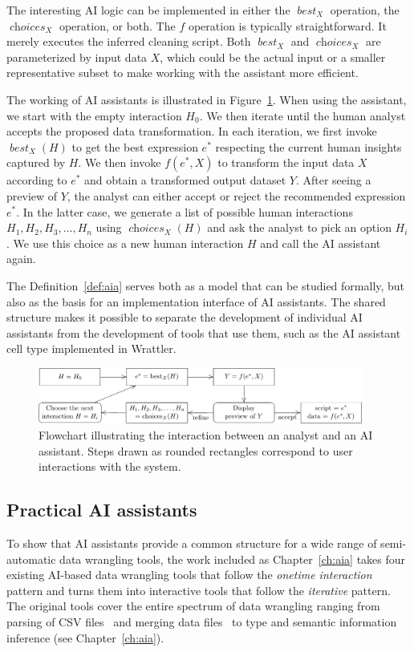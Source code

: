 \documentclass[fleqn,11pt]{report}
\newcommand{\Din}{X}
\newcommand{\Dout}{Y}
\DeclareMathOperator{\choices}{\mathit{choices}}
\DeclareMathOperator{\best}{\mathit{best}}
\theoremstyle{definition}
\begin{document}
The interesting AI logic can be implemented in either the $\best_\Din$
operation, the $\choices_\Din$ operation, or both. The $f$ operation is typically
straightforward. It merely executes the inferred cleaning script. Both $\best_{\Din}$ and
$\choices_{\Din}$ are parameterized by input data $\Din$, which could be the actual input or a
smaller representative subset to make working with the assistant more efficient.

The working of AI assistants is illustrated in Figure~\ref{fig:interaction}. When using
the assistant, we start with the empty interaction $H_0$. We then iterate until the human analyst
accepts the proposed data transformation. In each iteration, we first invoke $\best_\Din(H)$ to get
the best expression $e^{*}$ respecting the current human insights captured by $H$. We then invoke
$f(e^{*}, \Din)$ to transform the input data $\Din$ according to $e^{*}$ and obtain a transformed
output dataset $\Dout$. After seeing a preview of $\Dout$, the analyst can either accept or reject
the recommended expression $e^{*}$. In the latter case, we generate a list of possible human
interactions $H_1, H_2, H_3, \ldots, H_n$ using $\choices_\Din(H)$ and ask the analyst to pick an
option $H_i$. We use this choice as a new human interaction $H$ and call
the AI assistant again.

The Definition~\ref{def:aia} serves both as a model that can be studied formally,
but also as the basis for an implementation interface of AI assistants. The shared structure
makes it possible to separate the development of individual AI assistants from the development
of tools that use them, such as the AI assistant cell type implemented in Wrattler.

\begin{figure}
\centering
\vspace{-1em}
\includegraphics[width=0.95\textwidth]{img/aias.pdf}
\caption{Flowchart illustrating the interaction between an analyst and an AI assistant.
Steps drawn as rounded rectangles correspond to user interactions with the system.}
\label{fig:interaction}
\vspace{-0.5em}
\end{figure}

\subsection{Practical AI assistants}
To show that AI assistants provide a common structure for a wide range of semi-automatic
data wrangling tools, the work included as Chapter~\ref{ch:aia} takes four existing
AI-based data wrangling tools that follow the \emph{onetime interaction} pattern and turns them
into interactive tools that follow the \emph{iterative} pattern. The original tools
cover the entire spectrum of data wrangling ranging from parsing of CSV files~\citep{gerrit-2019-csv}
and merging data files~\citep{sutton-2018-datadiff} to type and semantic information inference
(see Chapter~\ref{ch:aia}).
\end{document}
